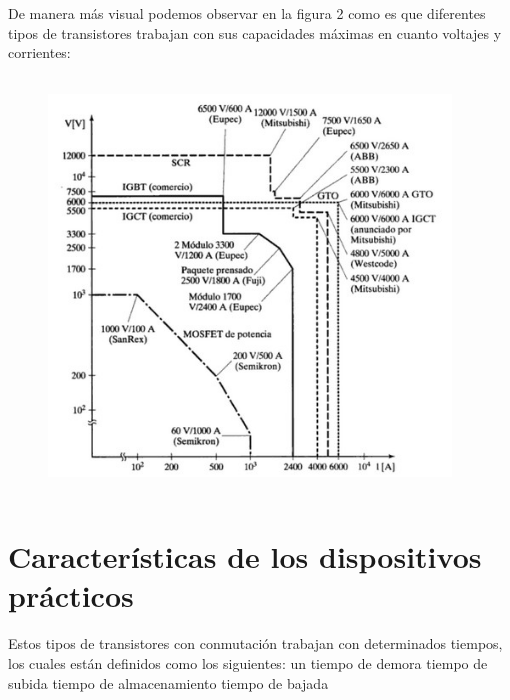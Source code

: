 \documentclass[12pt]{article}
\begin{document}
\setlength{\parskip}{0.0pt}
De manera más visual podemos observar en la figura 2 como es que diferentes tipos de transistores trabajan con sus capacidades máximas en cuanto voltajes y corrientes:\par




\begin{figure}[H]
	\begin{Center}
		\includegraphics[width=4.21in,height=4.34in]{./media/image3.jpg}
	\end{Center}
\end{figure}



\par


\vspace{\baselineskip}
\setlength{\parskip}{8.04pt}

\vspace{\baselineskip}
\section{Características de los dispositivos prácticos}
\setlength{\parskip}{4.2pt}
\begin{adjustwidth}{-0.01in}{-0.01in}
Estos tipos de transistores con conmutación trabajan con determinados tiempos, los cuales están definidos como los siguientes: un tiempo de demora tiempo de subida tiempo de almacenamiento tiempo de bajada\par

\end{adjustwidth}
\end{document}
